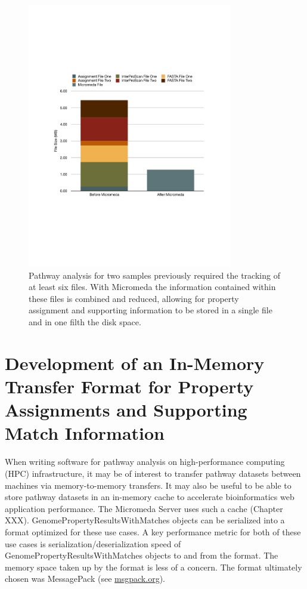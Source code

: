 \begin{figure}[!ht]
  \centering
	\includegraphics[width=0.80\textwidth]{media/micromeda_file_size.pdf}
	 \caption{Pathway analysis for two samples previously required the tracking of at least six files. With Micromeda the information contained within these files is combined and reduced, allowing for property assignment and supporting information to be stored in a single file and in one filth the disk space.}
	 \label{fig:micromedafilesize}
\end{figure}

\section{Development of an In-Memory Transfer Format for Property Assignments and Supporting Match Information} \label{msgpack}

When writing software for pathway analysis on high-performance computing (HPC) infrastructure, it may be of interest to transfer pathway datasets between machines via memory-to-memory transfers. It may also be useful to be able to store pathway datasets in an in-memory cache to accelerate bioinformatics web application performance. The Micromeda Server uses such a cache (Chapter XXX). GenomePropertyResultsWithMatches objects can be serialized into a format optimized for these use cases. A key performance metric for both of these use cases is serialization/deserialization speed of GenomePropertyResultsWithMatches objects to and from the format. The memory space taken up by the format is less of a concern. The format ultimately chosen was MessagePack  \cite{furuhashi2013messagepack}(see \href{msgpack.org}{msgpack.org}).

